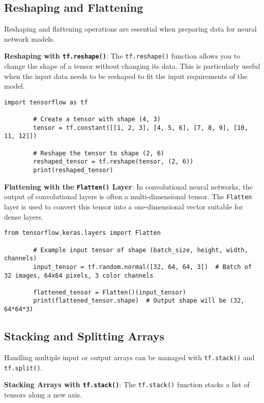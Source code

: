 	\subsection{Reshaping and Flattening}
	Reshaping and flattening operations are essential when preparing data for neural network models. 
	
	\textbf{Reshaping with \texttt{tf.reshape()}}: The \texttt{tf.reshape()} function allows you to change the shape of a tensor without changing its data. This is particularly useful when the input data needs to be reshaped to fit the input requirements of the model.
	
	\begin{lstlisting}[caption={Reshaping a Tensor}, label={code:reshape}, style=pythonstyle]
		import tensorflow as tf
		
		# Create a tensor with shape (4, 3)
		tensor = tf.constant([[1, 2, 3], [4, 5, 6], [7, 8, 9], [10, 11, 12]])
		
		# Reshape the tensor to shape (2, 6)
		reshaped_tensor = tf.reshape(tensor, (2, 6))
		print(reshaped_tensor)
	\end{lstlisting}
	
	\textbf{Flattening with the \texttt{Flatten()} Layer}: In convolutional neural networks, the output of convolutional layers is often a multi-dimensional tensor. The \texttt{Flatten} layer is used to convert this tensor into a one-dimensional vector suitable for dense layers.
	
	\begin{lstlisting}[caption={Flattening a Tensor}, label={code:flatten}, style=pythonstyle]
		from tensorflow.keras.layers import Flatten
		
		# Example input tensor of shape (batch_size, height, width, channels)
		input_tensor = tf.random.normal([32, 64, 64, 3])  # Batch of 32 images, 64x64 pixels, 3 color channels
		
		flattened_tensor = Flatten()(input_tensor)
		print(flattened_tensor.shape)  # Output shape will be (32, 64*64*3)
	\end{lstlisting}
	
	\subsection{Stacking and Splitting Arrays}
	Handling multiple input or output arrays can be managed with \texttt{tf.stack()} and \texttt{tf.split()}.
	
	\textbf{Stacking Arrays with \texttt{tf.stack()}}: The \texttt{tf.stack()} function stacks a list of tensors along a new axis.
	
